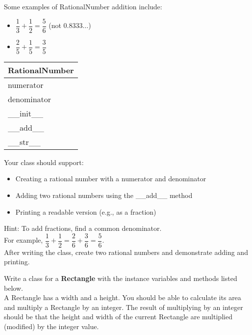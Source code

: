 		\begin{minipage}[t]{0.65\textwidth}
			Some examples of RationalNumber addition include:
			\begin{itemize}
				\item $\dfrac{1}{3} + \dfrac{1}{2} = \dfrac{5}{6}$ (not $0.8333\ldots$)
				\item $\dfrac{2}{5} + \dfrac{1}{5} = \dfrac{3}{5}$
			\end{itemize}
		\end{minipage}
		\hfill
		\begin{minipage}[t]{0.32\textwidth}
			\vspace{.2em}
			\begin{flushright}
				\begin{tabular}{|l|}
				\hline
				RationalNumber \\ \hline
				numerator \\
				denominator \\ \hline
				\_\_init\_\_ \\
				\_\_add\_\_ \\
				\_\_str\_\_ \\ \hline
				\end{tabular}
			\end{flushright}
		\end{minipage}
		
		Your class should support:
		\begin{itemize}
			\item Creating a rational number with a numerator and denominator
			\item Adding two rational numbers using the \_\_add\_\_ method 
			\item Printing a readable version (e.g., as a fraction)
		\end{itemize}
		
		Hint: To add fractions, find a common denominator.\\
		For example, $\dfrac{1}{3} + \dfrac{1}{2} = \dfrac{2}{6} + \dfrac{3}{6} = \dfrac{5}{6}$.\\
		\newline
		After writing the class, create two rational numbers and demonstrate adding and printing.




	\item
		Write a class for a \textbf{Rectangle} with the instance variables and methods 
		listed below.\\
		A Rectangle has a width and a height. You should be able to calculate its area	and multiply 
		a Rectangle by an integer. The result of multiplying by an integer should be that the height 
		and width of the current Rectangle are multiplied (modified) by the integer value.

